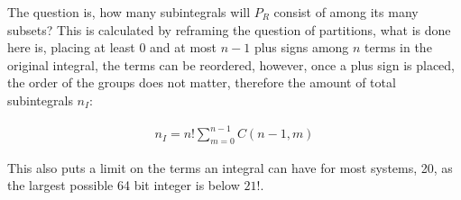 \documentclass[11pt,a4paper]{book}
\begin{document}
The question is, how many subintegrals will $P_R$ consist of among its many subsets? This is calculated by reframing the question of partitions, what is done here is, placing at least 0 and at most $n-1$ plus signs among $n$ terms in the original integral, the terms can be reordered, however, once a plus sign is placed, the order of the groups does not matter, therefore the amount of total subintegrals $n_I$:

\begin{align}
n_I = n! \sum_{m = 0}^{n - 1} C(n - 1, m)
\end{align}

This also puts a limit on the terms an integral can have for most systems, 20, as the largest possible 64 bit integer is below $21!$.


\end{document}
